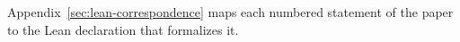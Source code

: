 \documentclass[11pt]{article}
\newcommand{\T}{\mathbb T}
\newcommand{\E}{\mathcal E}
\begin{document}
Appendix~\ref{sec:lean-correspondence} maps each numbered statement of the paper to the Lean declaration that formalizes it.
%
%
%

%
%
%
\end{document}
